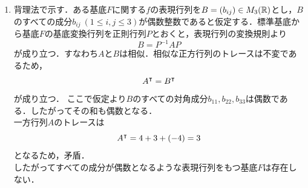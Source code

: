 \documentclass[dvipdfmx]{jsreport}
\begin{document}
\begin{souanswer}
\begin{enumerate}
  \item 背理法で示す．ある基底$F$に関する$f$の表現行列を$B= (b_{ij})\in M_3(\mathbb{R})$とし，$B$のすべての成分$b_{ij}\ (1\le i, j\le 3)$が偶数整数であると仮定する．標準基底から基底$F$の基底変換行列を正則行列$P$とおくと，表現行列の変換規則より
\begin{equation*}
  B= P^{-1}AP
\end{equation*}
  が成り立つ．すなわち$A$と$B$は相似．相似な正方行列のトレースは不変であるため，
\begin{equation*}
  {A}^\intercal= {B}^\intercal
\end{equation*}
  が成り立つ．
  ここで仮定より$B$のすべての対角成分$b_{11}, b_{22}, b_{33}$は偶数である．したがってその和も偶数となる．\\
  一方行列$A$のトレースは
\begin{equation*}
  {A}^\intercal= 4+ 3+ (-4)= 3
\end{equation*}
  となるため，矛盾．\\
  したがってすべての成分が偶数となるような表現行列をもつ基底$F$は存在しない．
\end{enumerate}
\end{souanswer}
\end{document}
